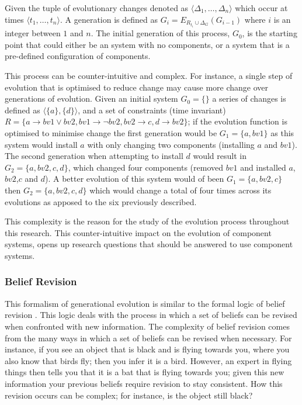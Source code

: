 Given the tuple of evolutionary changes denoted as $\langle \Delta_1, \ldots, \Delta_n \rangle$
which occur at times  $\langle t_1, \ldots, t_n \rangle$.
A generation is defined as $G_i = E_{R_{t_i} \cup \Delta_G}(G_{i-1})$ where $i$ is an integer between $1$ and $n$.
The initial generation of this process, $G_0$, is the starting point that could either be an system with no components, or a system that is a pre-defined configuration of components.

This process can be counter-intuitive and complex.
For instance, a single step of evolution that is optimised to reduce change may cause more change over generations of evolution.
Given an initial system $G_0 = \{\}$ a series of changes is defined as $\langle \{a\}, \{d\}\rangle$, 
and a set of constraints (time invariant) $R = \{a \rightarrow bv1 \vee bv2, bv1 \rightarrow \neg bv2, bv2 \rightarrow c, d \rightarrow bv2\}$;
if the evolution function is optimised to minimise change the first generation would be $G_1 = \{a,bv1\}$ as this system would install $a$ with only changing two components (installing $a$ and $bv1$).
The second generation when attempting to install $d$ would result in $G_2 = \{a,bv2,c,d\}$, which changed four components (removed $bv1$ and installed $a$,$bv2$,$c$ and $d$).
A better evolution of this system would of been $G_1 = \{a,bv2,c\}$ then $G_2 = \{a,bv2,c,d\}$ which would change a total of four times across its evolutions as apposed to the six previously described.

This complexity is the reason for the study of the evolution process throughout this research. 
This counter-intuitive impact on the evolution of component systems, opens up research questions that should be answered to use component systems.

\subsubsection{Belief Revision}
This formalism of generational evolution is similar to the formal logic of belief revision \cite{alchourron1985logic}.
This logic deals with the process in which a set of beliefs can be revised when confronted with new information.
The complexity of belief revision comes from the many ways in which a set of beliefs can be revised when necessary.
For instance, if you see an object that is black and is flying towards you, where you also know that birds fly; then you infer it is a bird.
However, an expert in flying things then tells you that it is a bat that is flying towards you; given this new information your previous beliefs require revision to stay consistent.
How this revision occurs can be complex; for instance, is the object still black?

